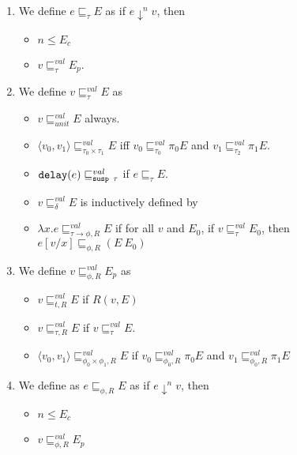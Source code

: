 \begin{enumerate}
  \item We define $e \sqsubseteq_\tau E$ as if $e \downarrow^n v$, then
    \begin{itemize}
      \item $n \leq E_c$
      \item $v \sqsubseteq_\tau^{val} E_p$.
    \end{itemize}
  \item We define $v \sqsubseteq_\tau^{val} E$ as
    \begin{itemize}
      \item $v \sqsubseteq_{unit}^{val} E$ always.
      \item $\langle v_0,v_1 \rangle \sqsubseteq_{\tau_0 \times \tau_1}^{val} E$ iff $v_0 \sqsubseteq_{\tau_0}^{val} \pi_0 E$ and $v_1 \sqsubseteq_{\tau_2}^{val} \pi_1 E$.
      \item $\T{delay}(e) \sqsubseteq_{\T{susp }\tau}^{val}$ if $e \sqsubseteq_\tau E$.
      \item $v \sqsubseteq_\delta^{val} E$ is inductively defined by
        \begin{prooftree}
        \end{prooftree}
      \item $\lambda x.e \sqsubseteq^{val}_{\tau \to \phi,R} E$ if for all $v$ and $E_0$, if $v \sqsubseteq_\tau^{val} E_0$, then $e[v/x] \sqsubseteq_{\phi,R}(E\ E_0)$
    \end{itemize}
  \item We define $v \sqsubseteq_{\phi,R}^{val} E_p$ as
    \begin{itemize}
      \item $v \sqsubseteq_{t,R}^{val} E $ if $R(v,E)$
      \item $v \sqsubseteq_{\tau,R}^{val} E$ if $v \sqsubseteq_\tau^{val} E$.
      \item $\langle v_0,v_1\rangle \sqsubseteq_{\phi_0\times\phi_1,R}^{val} E$ if $v_0 \sqsubseteq_{\phi_0,R}^{val} \pi_0 E$ and $v_1 \sqsubseteq_{\phi_0,R}^{val} \pi_1 E$
    \end{itemize}
  \item We define as $e \sqsubseteq_{\phi,R} E$ as if $e \downarrow^n v$, then
    \begin{itemize}
      \item $n \leq E_c$
      \item $v \sqsubseteq_{\phi,R}^{val} E_p$
    \end{itemize}
\end{enumerate}
